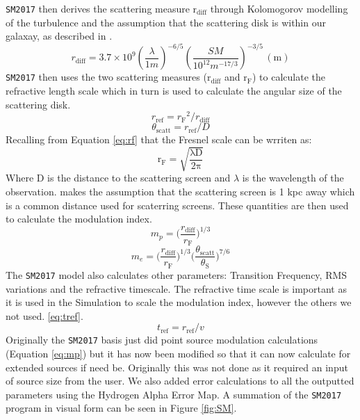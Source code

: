 \documentclass[a4paper, 10pt]{article}
\def\rf{{\ensuremath{r_{\mathrm{F}}}}}
\def\rref{{\ensuremath{r_{\mathrm{ref}}}}}
\def\rdiff{{\ensuremath{r_{\mathrm{diff}}}}}
\def\tscatt{{\ensuremath{\theta_{\mathrm{scatt}}}}}
\begin{document}
\texttt{SM2017} then derives the scattering measure $\mathrm{r_{diff}}$ through Kolomogorov modelling of the turbulence and the assumption that the scattering disk is within our galaxay, as described in \citet{JP}.
\begin{equation}
\rdiff = 3.7\times 10^9 \left(\frac{\lambda}{1m}\right)^{-6/5} \left(\frac{SM}{10^{12} m^{-17/3}}\right)^{-3/5}\, (\mathrm{m})
\end{equation}
\texttt{SM2017} then uses the two scattering measures ($\mathrm{r_{diff}}$ and $\mathrm{r_{F}}$) to calculate the refractive length scale which in turn is used to calculate the angular size of the scattering disk. 
\begin{equation}
    \rref = \rf^2 / \rdiff
\end{equation}
\begin{equation}
    \tscatt = \rref / D 
\end{equation}
Recalling from Equation \ref{eq:rf} that the Fresnel scale can be wrriten as:
\[\mathrm{
r_F=\sqrt{\dfrac{\lambda D}{2 \pi}}
}\]
Where D is the distance to the scattering screen and $\lambda$ is the wavelength of the observation.  makes the assumption that the scattering screen is 1 kpc away which is a common distance used for scaterring screens. These quantities are then used to calculate the modulation index.
\begin{equation}\label{eq:mp}
   m_p=\bigg(\dfrac{r_{\mathrm{diff}}}{r_{\mathrm{F}}}\bigg)^{1/3}
\end{equation}
\begin{equation}\label{eq:me}
   m_e=\bigg(\dfrac{r_{\mathrm{diff}}}{r_{\mathrm{F}}}\bigg)^{1/3}\bigg(\dfrac{\theta_{\mathrm{scatt}}}{\theta_\mathrm{S}}\bigg)^{7/6}
\end{equation}
The \texttt{SM2017} model also calculates other parameters: Transition Frequency, RMS variations and the refractive timescale. The refractive time scale is important as it is used in the Simulation to scale the modulation index, however the others we not used.
\ref{eq:tref}.
\begin{equation}\label{eq:tref}
    t_\mathrm{ref} = \rref / v
\end{equation}
Originally the \texttt{SM2017} basis just did point source modulation calculations (Equation \ref{eq:mp}) but it has now been modified so that it can now calculate for extended sources if need be. Originally this was not done as it required an input of source size from the user. We also added error calculations to all the outputted parameters using the Hydrogen Alpha Error Map. A summation of the \texttt{SM2017} program in visual form can be seen in Figure \ref{fig:SM}.
\end{document}
